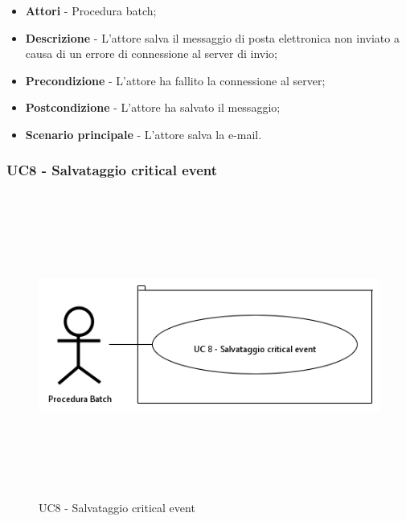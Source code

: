                 \begin{itemize}

                    \item \textbf{Attori} - Procedura batch;
                    \item \textbf{Descrizione} - L'attore salva il messaggio di posta elettronica non inviato a causa
                    di un errore di connessione al server di invio;
                    \item \textbf{Precondizione} - L'attore ha fallito la connessione al server;
                    \item \textbf{Postcondizione} - L'attore ha salvato il messaggio;
                    \item \textbf{Scenario principale} - L'attore salva la e-mail.

                \end{itemize}

\newpage

            \subsubsection{UC8 - Salvataggio critical event}

                \begin{figure}[H]
                    \centering
                    \includegraphics[width=13cm,height=10cm,keepaspectratio]{./images/UC8.png}
                    \caption{UC8 - Salvataggio critical event}
                \end{figure}

